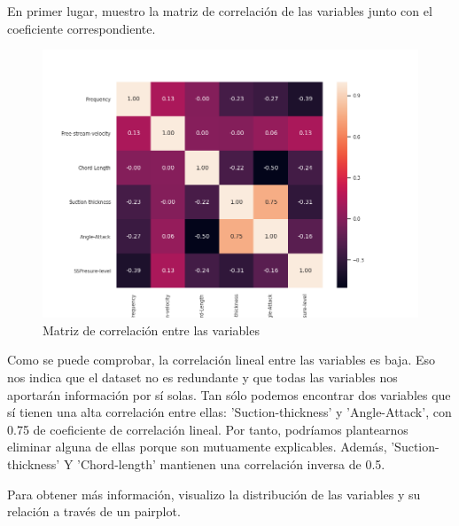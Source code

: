 En primer lugar, muestro la matriz de correlación de las variables junto con el coeficiente correspondiente.
\begin{figure}[H] %
	\centering
	\includegraphics[scale=0.6]{corr-airfoil.png}  %
	\caption{Matriz de correlación entre las variables} 
	\label{fig:corr-airfoil}
\end{figure}

Como se puede comprobar, la correlación lineal entre las variables es baja. Eso nos indica que el dataset no es redundante y que todas las variables nos aportarán información por sí solas. Tan sólo podemos encontrar dos variables que sí tienen una alta correlación entre ellas: 'Suction-thickness' y 'Angle-Attack', con 0.75 de coeficiente de correlación lineal. Por tanto, podríamos plantearnos eliminar alguna de ellas porque son mutuamente explicables. Además, 'Suction-thickness' Y 'Chord-length' mantienen una correlación inversa de 0.5. 

Para obtener más información, visualizo la distribución de las variables y su relación a través de un pairplot.

